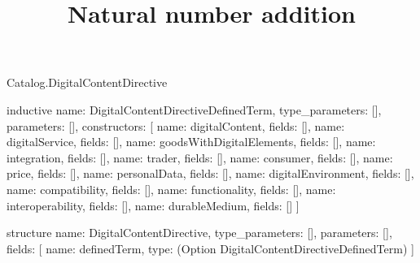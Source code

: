 \begin{lexlean}{Catalog.DigitalContentDirective}
\title{Natural number addition}
\begin{semanticmodule}
inductive{
  name: DigitalContentDirectiveDefinedTerm,
  type_parameters: [],
  parameters: [],
  constructors: [
    {name: digitalContent, fields: []},
    {name: digitalService, fields: []},
    {name: goodsWithDigitalElements, fields: []},
    {name: integration, fields: []},
    {name: trader, fields: []},
    {name: consumer, fields: []},
    {name: price, fields: []},
    {name: personalData, fields: []},
    {name: digitalEnvironment, fields: []},
    {name: compatibility, fields: []},
    {name: functionality, fields: []},
    {name: interoperability, fields: []},
    {name: durableMedium, fields: []}
  ]
}

structure{
  name: DigitalContentDirective,
  type_parameters: [],
  parameters: [],
  fields: [
    {name: definedTerm, type: (Option DigitalContentDirectiveDefinedTerm)}
  ]
}
\end{semanticmodule}
\end{lexlean}
